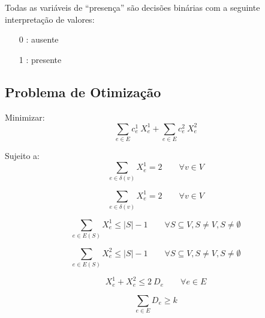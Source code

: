 \documentclass{article}
\newcommand{\Sum}[1]{\ensuremath{\displaystyle\sum\limits_{#1}}}
\newcommand{\abs}[1]{\ensuremath{\left| #1 \right|}}
\newcommand{\edge}{\ensuremath{e}}
\newcommand{\edges}{\ensuremath{E}}
\newcommand{\vertex}{\ensuremath{v}}
\newcommand{\vertices}{\ensuremath{V}}
\newcommand{\subvertices}{\ensuremath{S}}
\newcommand{\coe}{\ensuremath{c^{1}_{\edge}}}
\newcommand{\cte}{\ensuremath{c^{2}_{\edge}}}
\newcommand{\xoe}{\ensuremath{X^{1}_{\edge}}}
\newcommand{\xte}{\ensuremath{X^{2}_{\edge}}}
\newcommand{\de}{\ensuremath{D_{\edge}}}
\newcommand{\similarity}{\ensuremath{k}}
\begin{document}
Todas as variáveis de ``presença'' são decisões binárias com a seguinte interpretação de valores:

\begin{itemize}
	\item[0]: ausente
	\item[1]: presente
\end{itemize}

\subsection{Problema de Otimização}

Minimizar:
\begin{equation}
    \label{eq:goal}
 	\Sum{\edge \in \edges} \coe \ \xoe
 	+
 	\Sum{\edge \in \edges} \cte \ \xte
\end{equation}

Sujeito a:
\begin{equation}
	\label{constraint:vertex presence in 1}
	\Sum{\edge \in \delta(\vertex)} \xoe = 2
	\qquad
	\forall \vertex \in \vertices
\end{equation}

\begin{equation}
	\label{constraint:vertex presence in 2}
	\Sum{\edge \in \delta(\vertex)} \xoe = 2
	\qquad
	\forall \vertex \in \vertices
\end{equation}

\begin{equation}
	\label{constraint:no subcycle 1}
	\Sum{\edge \in \edges(\subvertices)} \xoe \leq \abs{\subvertices} - 1
	\qquad
	\forall
		\subvertices \subseteq \vertices,
		\subvertices \neq \vertices,
		\subvertices \neq \emptyset
\end{equation}

\begin{equation}
	\label{constraint:no subcycle 2}
	\Sum{\edge \in \edges(\subvertices)} \xte \leq \abs{\subvertices} - 1
	\qquad
	\forall
		\subvertices \subseteq \vertices,
		\subvertices \neq \vertices,
		\subvertices \neq \emptyset
\end{equation}

\begin{equation}
	\label{constraint:similarity compatibility}
	\xoe + \xte \leq 2 \ \de
	\qquad
	\forall \edge \in \edges
\end{equation}

\begin{equation}
	\label{constraint:similarity}
	\Sum{\edge \in \edges} \de \geq \similarity
\end{equation}
\end{document}
